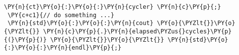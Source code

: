  {\footnotesize
 \begin{Verbatim}[commandchars=\\\{\}]
 \PY{n}{ct}\PY{o}{:}\PY{o}{:}\PY{n}{cycler} \PY{n}{c}\PY{p}{;}
 \PY{c+c1}{// do something ...}
 \PY{n}{std}\PY{o}{:}\PY{o}{:}\PY{n}{cout} \PY{o}{\PYZlt{}}\PY{o}{\PYZlt{}} \PY{n}{c}\PY{p}{.}\PY{n}{elapsed\PYZus{}cycles}\PY{p}{(}\PY{p}{)} \PY{o}{\PYZlt{}}\PY{o}{\PYZlt{}} \PY{n}{std}\PY{o}{:}\PY{o}{:}\PY{n}{endl}\PY{p}{;}
 \end{Verbatim}
 }
